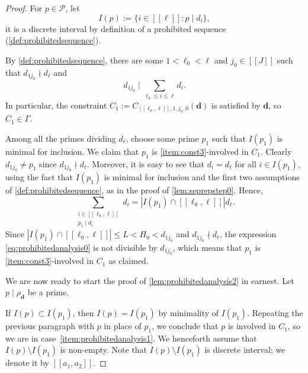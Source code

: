 \documentclass[11pt]{amsart}
\theoremstyle{definition}
\renewcommand{\leq}{\leqslant}
\newcommand{\interval}[2]{[\![#1,#2]\!] }
\newcommand{\sinterval}[1]{[\![#1]\!] }
\newcommand{\abs}[1]{\left|#1\right|}
\newcommand{\primes}{\mathcal{P}}
\renewcommand{\d}{\boldsymbol{d}}
\newcommand{\pcomp}[2]{d_{#1#2}}
\newcommand{\fprod}[1]{\rho_{#1}}
\newcommand{\pall}{\fprod{\d}}
\newcommand{\ellp}{\ell}
\newcommand{\ellm}{\ell_0}
\newcommand{\elln}{L}
\newcommand{\newR}{\sinterval{J}}
\newcommand{\pplus}{p_{1}}
\newcommand{\mprimeone}{p}
\begin{document}
\begin{proof}
For $p\in \primes$, let 
\begin{equation*}
	I(p) := \{i\in \sinterval{{\ellp}}: p\mid d_i\},
\end{equation*}
it is a discrete interval by definition of a prohibited sequence (\cref{def:prohibitedsequence}). 

By \cref{def:prohibitedsequence}, there are some $1<\ellm<\ellp$ and $j_0\in \newR$ such that $\pcomp{1}{j_0}\nmid d_{\ellp}$ and
\begin{equation}
\label{eq:prohibitedanalysiscstrt}
	\pcomp{1}{j_0} \mid \sum_{\ellm\leq i\leq \ellp} d_i.
\end{equation}
In particular, the constraint $C_1 := C_{\interval{\ellm}{\ellp},1,j_0,0}(\d)$ is satisfied by $\d$, so $C_1 \in \Gamma$.

Among all the primes dividing $d_{\ellp}$, choose some prime $\pplus$ such that $I(\pplus)$ is minimal for inclusion. We claim that $\pplus$ is \cref{item:const3}-involved in $C_1$. Clearly $\pcomp{1}{j_0}\neq \pplus$ since $\pcomp{1}{j_0}\nmid d_{\ellp}$. Moreover, it is easy to see that $d_i = d_{\ellp}$ for all $i\in I(\pplus)$, using the fact that $I(\pplus)$ is minimal for inclusion and the first two assumptions of \cref{def:prohibitedsequence}, as in the proof of \cref{lem:seprepstep0}. Hence,
\begin{equation}
\label{eq:prohibitedanalysis0}
	\sum_{\substack{i\in \interval{\ellm}{\ellp}\\ \pplus\mid d_i}}d_i = \abs{I(\pplus)\cap \interval{\ellm}{\ellp}} d_{\ellp}.
\end{equation}
Since $\abs{I(\pplus)\cap \interval{\ellm}{\ellp}}\leq \elln < H_0 < \pcomp{1}{j_0}$ and $\pcomp{1}{j_0}\nmid d_{\ellp}$, the expression \cref{eq:prohibitedanalysis0} is not divisible by ${\pcomp{1}{j_0}}$, which means that $\pplus$ is \cref{item:const3}-involved in $C_1$ as claimed.

We are now ready to start the proof of \cref{lem:prohibitedanalysis2} in earnest. Let $\mprimeone\mid \pall$ be a prime. 

If $I(\mprimeone) \subset I(\pplus)$, then $I(\mprimeone) = I(\pplus)$ by minimality of $I(\pplus)$. Repeating the previous paragraph with $\mprimeone$ in place of $\pplus$, we conclude that $\mprimeone$ is involved in $C_1$, so we are in case~\cref{item:prohibitedanalysis1}. We henceforth assume that $I(\mprimeone) \setminus I(\pplus)$ is non-empty. Note that $I(\mprimeone) \setminus I(\pplus)$ is discrete interval; we denote it by $\interval{a_1}{a_2}$.


\end{proof}
\end{document}
